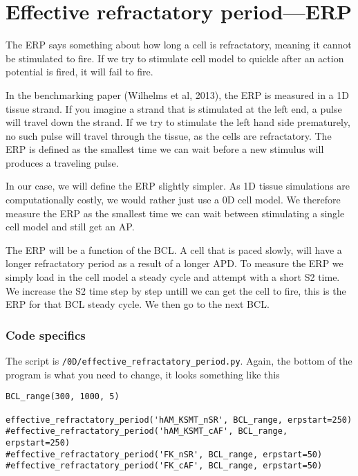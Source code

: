 \documentclass[a4paper, 11pt, notitlepage, english]{article}
\begin{document}
\section*{Effective refractatory period---ERP}

The ERP says something about how long a cell is refractatory, meaning it cannot be stimulated to fire. If we try to stimulate cell model to quickle after an action potential is fired, it will fail to fire. 

In the benchmarking paper (Wilhelms et al, 2013), the ERP is measured in a 1D tissue strand. If you imagine a strand that is stimulated at the left end, a pulse will travel down the strand. If we try to stimulate the left hand side prematurely, no such pulse will travel through the tissue, as the cells are refractatory. The ERP is defined as the smallest time we can wait before a new stimulus will produces a traveling pulse.

In our case, we will define the ERP slightly simpler. As 1D tissue simulations are computationally costly, we would rather just use a 0D cell model. We therefore measure the ERP as the smallest time we can wait between stimulating a single cell model and still get an AP.

The ERP will be a function of the BCL. A cell that is paced slowly, will have a longer refractatory period as a result of a longer APD. To measure the ERP we simply load in the cell model a steady cycle and attempt with a short S2 time. We increase the S2 time step by step untill we can get the cell to fire, this is the ERP for that BCL steady cycle. We then go to the next BCL.

\subsubsection*{Code specifics}

The script is \verb+/0D/effective_refractatory_period.py+. Again, the bottom of the program is what you need to change, it looks something like this

\begin{lstlisting}
BCL_range(300, 1000, 5)

effective_refractatory_period('hAM_KSMT_nSR', BCL_range, erpstart=250)
#effective_refractatory_period('hAM_KSMT_cAF', BCL_range, erpstart=250)
#effective_refractatory_period('FK_nSR', BCL_range, erpstart=50)
#effective_refractatory_period('FK_cAF', BCL_range, erpstart=50)
\end{lstlisting}
\end{document}
